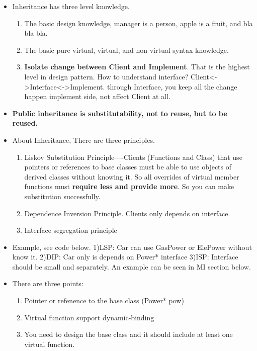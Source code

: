 \documentclass[a4paper,12pt,twoside]{book}
\begin{document}
\begin{itemize}
\item Inheritance has three level knowledge.
\begin{enumerate}
\item The basic design knowledge, manager is a person, apple is a fruit, and bla bla bla.
\item The basic  pure virtual, virtual, and non virtual syntax knowledge.
\item \textbf{Isolate change between Client and Implement}. That is the highest level in design pattern. How to understand interface? Client<->Interface<->Implement. through Interface, you keep all the change happen implement side, not affect Client at all.
\end{enumerate}

\item \textbf{Public inheritance is substitutability, not to reuse, but to be reused. }
\item About Inheritance, There are three principles.
\begin{enumerate}
\item Liskov Substitution Principle----Clients (Functions and Class) that use pointers or references to base classes must be able to use objects of derived classes without knowing it.  So all overrides of virtual member functions must \textbf{require less and provide more}. So you can make substitution successfully.

\item Dependence Inversion Principle. Clients only depends on interface.
\item Interface segregation principle
\end{enumerate}

\item Example, see code below.  1)LSP: Car can use  GasPower or ElePower without know it. 2)DIP: Car only is depends on Power* interface 3)ISP: Interface should be small and separately. An example can be seen in MI section below.

\item There are three points:
\begin{enumerate}
\item Pointer or refenence to the base class (Power* pow)
\item Virtual function support dynamic-binding
\item You need to design the base class and it should include at least one virtual function.
\end{enumerate}


\end{itemize}
\end{document}
